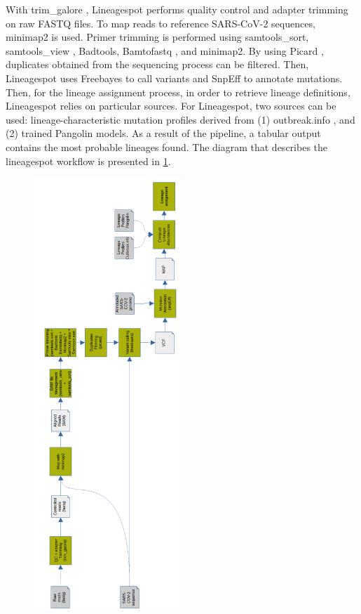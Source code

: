         With trim\_galore \cite{krueger2021}, Lineagespot performs quality control and adapter trimming on raw FASTQ files. To map reads to reference SARS-CoV-2 sequences, minimap2 \cite{li2018} is used. Primer trimming is performed using samtools\_sort, samtools\_view \cite{li2009}, Badtools, Bamtofastq \cite{bedtools}, and minimap2. By using Picard \cite{picard}, duplicates obtained from the sequencing process can be filtered. Then, Lineagespot uses Freebayes \cite{garrison2012} to call variants and SnpEff \cite{snpeff} to annotate mutations. Then, for the lineage assignment process, in order to retrieve lineage definitions, Lineagespot relies on particular sources. For Lineagespot, two sources can be used: lineage-characteristic mutation profiles derived from (1) outbreak.info \cite{outbreakinfo}, and (2) trained Pangolin \cite{otoole2021} models. As a result of the pipeline, a tabular output contains the most probable lineages found. The diagram that describes the lineagespot workflow is presented in \cref{fig:prior:ls}.
        
        \begin{figure}[h]
        	\centering
            \includegraphics[width=0.5\textwidth]{figures/prior/lineagespot_vertical.png}
            \label{fig:prior:ls}
        \end{figure}
        
